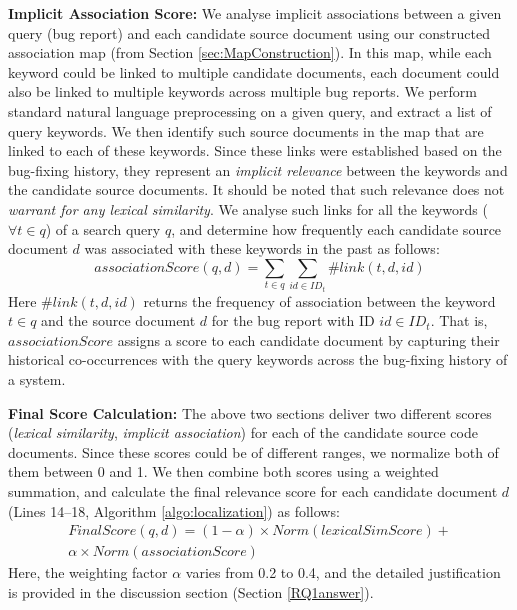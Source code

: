 \documentclass[sigconf,review,anonymous]{acmart}
\begin{document}
\textbf{Implicit Association Score:} We analyse implicit associations between a given query (bug report) and each candidate source document using our constructed association map (from Section \ref{sec:MapConstruction}). In this map, while each keyword could be linked to multiple candidate documents, each document could also be linked to multiple keywords across multiple bug reports. 
We perform standard natural language preprocessing on a given query, and extract a list of query keywords.
We then identify such source documents in the map that are linked to each of these keywords. Since these links were established based on the bug-fixing history, they represent an \emph{implicit relevance} between the keywords and the candidate source documents. It should be noted that such relevance does not \emph{warrant for any lexical similarity}.
We analyse such links for all the keywords ($\forall t\in q$) of a search query $q$, and determine how frequently each candidate source document $d$ was associated with these keywords in the past as follows: 
\begin{equation*}\label{CoOccequation}
associationScore(q,d)=\sum_{t\in q}\sum_{id\in ID_t} \#link(t,d,id)
\end{equation*}
Here $\#link(t,d,id)$ returns the frequency of association between the keyword $t\in q$ and the source document $d$ for the bug report with ID $id\in ID_t$.   
That is, $associationScore$ assigns a score to each candidate document by capturing their historical co-occurrences with the query keywords across the bug-fixing history of a system.

\textbf{Final Score Calculation:} The above two sections deliver two different scores (\emph{lexical similarity}, \emph{implicit association}) for each of the candidate source code documents. Since these scores could be of different ranges, we normalize both of them between 0 and 1. We then
combine both scores using a weighted summation, and calculate the final relevance score for each candidate document $d$ (Lines 14--18, Algorithm \ref{algo:localization}) as follows:
\begin{multline*}\label{equationVSMme}
FinalScore(q,d)=(1-\alpha )\times Norm(lexicalSimScore)+ \\
\alpha \times Norm(associationScore)
\end{multline*}
Here, the weighting factor $\alpha$ varies from 0.2 to 0.4, and
the detailed justification is provided in the discussion section (Section \ref{RQ1answer}). 
\end{document}
